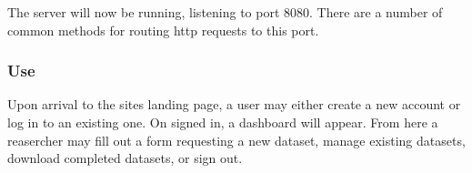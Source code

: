 \documentclass{article}
\begin{document}
The server will now be running, listening to port 8080. There are a number of common
methods for routing http requests to this port.

\subsubsection{Use}

Upon arrival to the sites landing page, a user may either create a new account or 
log in to an existing one. On signed in, a dashboard will appear. From here
a reasercher may fill out a form requesting a new dataset, manage existing datasets,
download completed datasets, or sign out.
\end{document}
